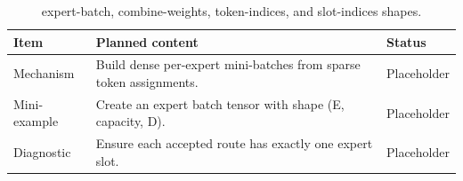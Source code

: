 \begin{table}[H]
\centering
\caption{expert-batch, combine-weights, token-indices, and slot-indices shapes.}
\label{tab:ch06-expert-batch-construction}
\begin{tabularx}{\textwidth}{p{}X p{}}
\toprule
Item & Planned content & Status \\
\midrule
Mechanism & Build dense per-expert mini-batches from sparse token assignments. & Placeholder \\
Mini-example & Create an expert batch tensor with shape (E, capacity, D). & Placeholder \\
Diagnostic & Ensure each accepted route has exactly one expert slot. & Placeholder \\
\bottomrule
\end{tabularx}
\end{table}
